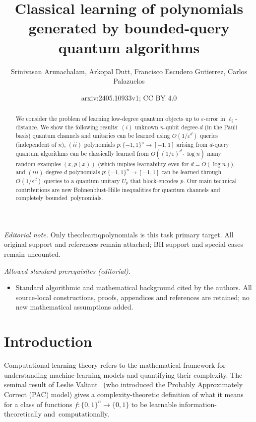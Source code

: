 \documentclass[11pt]{article}
\title{Classical learning of polynomials generated by bounded-query quantum algorithms}
\author{Srinivasan Arunachalam, Arkopal Dutt, Francisco Escudero Gutierrez, Carlos Palazuelos}
\date{arxiv:2405.10933v1; CC BY 4.0}
\def\01{\{0,1\}}
\newcommand{\eps}{\varepsilon}
\theoremstyle{plain}
\newcommand{\pmset}[1]{\{-1,1\}^{#1}} %
\theoremstyle{plain}
\theoremstyle{definition}
\theoremstyle{remark}
\theoremstyle{named}
\begin{document}
\maketitle
\noindent\textit{Editorial note.} Only theo:learnqpolynomials is this task primary target. All original support and references remain attached; BH support and special cases remain uncounted.\par\medskip
\noindent\textit{Allowed standard prerequisites (editorial).}\begin{itemize}
\item Standard algorithmic and mathematical background cited by the authors. All source-local constructions, proofs, appendices and references are retained; no new mathematical assumptions added.
\end{itemize}\medskip


\begin{abstract}
  


We consider the problem of learning low-degree quantum objects up to $\varepsilon$-error in $\ell_2$-distance. We show the following results:
$(i)$ unknown $n$-qubit  degree-$d$ (in the Pauli basis) quantum channels and unitaries can be learned  using  $O(1/\varepsilon^d)$ queries (independent of $n$), $(ii)$ polynomials $p:\pmset{n}\rightarrow [-1,1]$ arising from  $d$-query quantum algorithms can be classically learned from $O((1/\varepsilon)^d\cdot \log n)$ many random examples $(x,p(x))$ (which implies learnability even for $d=O(\log n)$), and $(iii)$ degree-$d$ polynomials $p:\{-1,1\}^n\to [-1,1]$ can be learned through $O_{}(1/\eps^d)$ queries to a quantum unitary $U_p$ that block-encodes  $p$. Our main technical contributions are new Bohnenblust-Hille inequalities for quantum channels and completely bounded~polynomials.


\end{abstract}



\section{Introduction}
Computational learning theory refers to the mathematical framework for understanding  machine learning models and quantifying their complexity. The seminal result of Leslie Valiant~\cite{DBLP:journals/cacm/Valiant84} (who introduced the Probably Approximately Correct (PAC) model) gives a complexity-theoretic definition of what it means for a class of functions $f:\01^n\rightarrow \01$ to be learnable information-theoretically and~computationally. 
\end{document}
